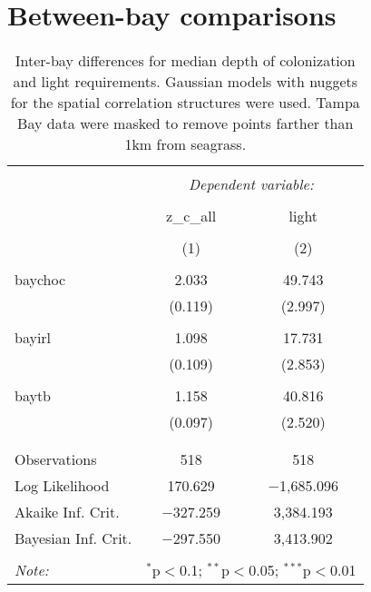 \documentclass[letterpaper,12pt]{article}\usepackage[]{graphicx}\usepackage[]{color}
\begin{document}
\section{Between-bay comparisons}    




\begin{table}[!htbp] \centering 
  \caption{Inter-bay differences for median depth of colonization and light requirements.  Gaussian models with nuggets for the spatial correlation structures were used.  Tampa Bay data were masked to remove points farther than 1km from seagrass.} 
  \label{} 
\begin{tabular}{@{\extracolsep{5pt}}lcc} 
\\[-1.8ex]\hline 
\hline \\[-1.8ex] 
 & \multicolumn{2}{c}{\textit{Dependent variable:}} \\ 
\cline{2-3} 
\\[-1.8ex] & z\_c\_all & light \\ 
\\[-1.8ex] & (1) & (2)\\ 
\hline \\[-1.8ex] 
 baychoc & 2.033 & 49.743 \\ 
  & (0.119) & (2.997) \\ 
  & & \\ 
 bayirl & 1.098 & 17.731 \\ 
  & (0.109) & (2.853) \\ 
  & & \\ 
 baytb & 1.158 & 40.816 \\ 
  & (0.097) & (2.520) \\ 
  & & \\ 
\hline \\[-1.8ex] 
Observations & 518 & 518 \\ 
Log Likelihood & 170.629 & $-$1,685.096 \\ 
Akaike Inf. Crit. & $-$327.259 & 3,384.193 \\ 
Bayesian Inf. Crit. & $-$297.550 & 3,413.902 \\ 
\hline 
\hline \\[-1.8ex] 
\textit{Note:}  & \multicolumn{2}{r}{$^{*}$p$<$0.1; $^{**}$p$<$0.05; $^{***}$p$<$0.01} \\ 
\end{tabular} 
\end{table} 
\end{document}
